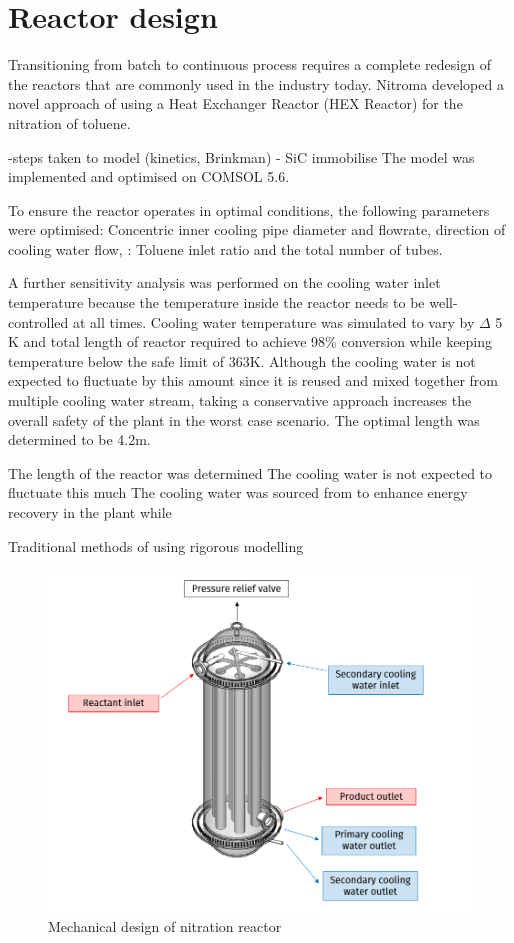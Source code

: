 \section*{Reactor design}


Transitioning from batch to continuous process requires a complete redesign of the reactors that are commonly used in the industry today. Nitroma developed a novel approach of using a Heat Exchanger Reactor (HEX Reactor) for the nitration of toluene.

-steps taken to model (kinetics, Brinkman) 
- SiC immobilise
The model was implemented and optimised on COMSOL 5.6. 

To ensure the reactor operates in optimal conditions, the following parameters were optimised: Concentric inner cooling pipe diameter and flowrate, direction of cooling water flow,  : Toluene inlet ratio and the total number of tubes.

A further sensitivity analysis was performed on the cooling water inlet temperature because the temperature inside the reactor needs to be well-controlled at all times. Cooling water temperature was simulated to vary by \mypm $\Delta$ 5 K and total length of reactor required to achieve 98\% conversion while keeping temperature below the safe limit of 363K. Although the cooling water is not expected to fluctuate by this amount since it is reused and mixed together from multiple cooling water stream, taking a conservative approach increases the overall safety of the plant in the worst case scenario. The optimal length was determined to be 4.2m. 

The length of the reactor was determined 
The cooling water is not expected to fluctuate this much 
The cooling water was sourced from to enhance energy recovery in the plant while

Traditional methods of using 
rigorous modelling


\begin{figure}[h]
    \centering
    \includegraphics[width=0.7\linewidth]{chapters/0-executive-summary/figures/FYD executive sum.PNG}
    \caption{Mechanical design of nitration reactor}
    \label{fig:executivesummaryreactor}
\end{figure}
